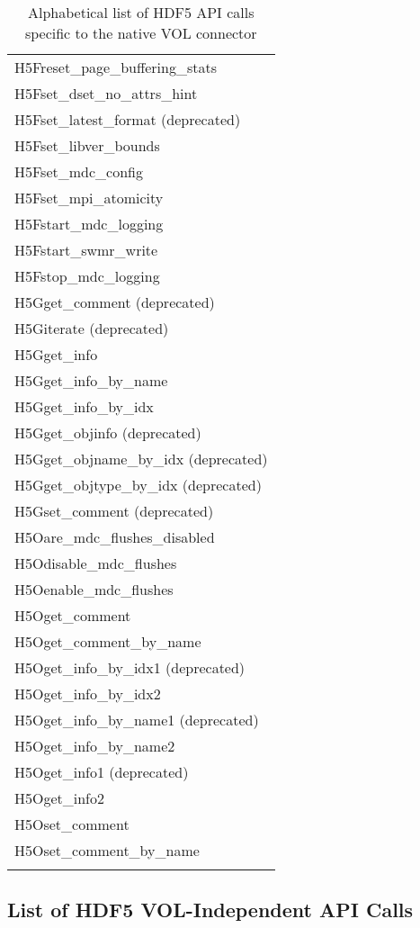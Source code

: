 \begin{longtable}{ |>{\raggedright\arraybackslash}p{\linewidth}| }
    H5Freset\_page\_buffering\_stats \\
    H5Fset\_dset\_no\_attrs\_hint \\
    H5Fset\_latest\_format (deprecated) \\
    H5Fset\_libver\_bounds \\
    H5Fset\_mdc\_config \\
    H5Fset\_mpi\_atomicity \\
    H5Fstart\_mdc\_logging \\
    H5Fstart\_swmr\_write \\
    H5Fstop\_mdc\_logging \\
    \hline
    H5Gget\_comment (deprecated) \\
    H5Giterate (deprecated) \\
    H5Gget\_info \\
    H5Gget\_info\_by\_name \\
    H5Gget\_info\_by\_idx \\
    H5Gget\_objinfo (deprecated) \\
    H5Gget\_objname\_by\_idx (deprecated) \\
    H5Gget\_objtype\_by\_idx (deprecated) \\
    H5Gset\_comment (deprecated) \\
    \hline
    H5Oare\_mdc\_flushes\_disabled \\
    H5Odisable\_mdc\_flushes \\
    H5Oenable\_mdc\_flushes \\
    H5Oget\_comment \\
    H5Oget\_comment\_by\_name \\
    H5Oget\_info\_by\_idx1 (deprecated) \\
    H5Oget\_info\_by\_idx2 \\
    H5Oget\_info\_by\_name1 (deprecated) \\
    H5Oget\_info\_by\_name2 \\
    H5Oget\_info1 (deprecated) \\
    H5Oget\_info2 \\
    H5Oset\_comment \\
    H5Oset\_comment\_by\_name \\
    \hline
\caption{Alphabetical list of HDF5 API calls specific to the native VOL connector}
\end{longtable}

\subsection{List of HDF5 VOL-Independent API Calls}

